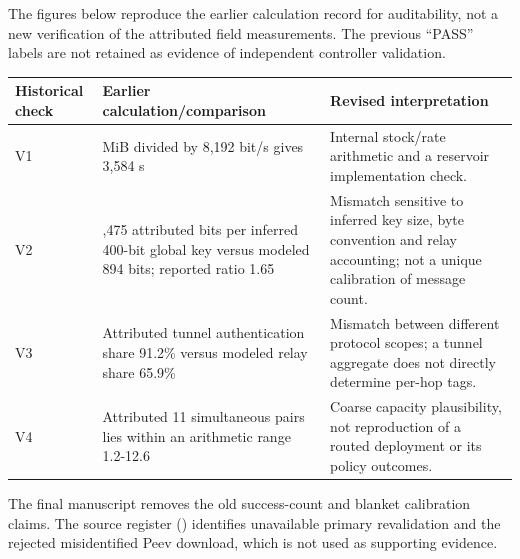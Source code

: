 The figures below reproduce the earlier calculation record for auditability, not a new verification of the attributed field measurements. The previous ``PASS'' labels are not retained as evidence of independent controller validation.

{\def\LTcaptype{none} %
\begin{longtable}[]{@{}
  >{\raggedright\arraybackslash}p{}
  >{\raggedright\arraybackslash}p{}
  >{\raggedright\arraybackslash}p{}@{}}
\toprule\noalign{}
\begin{minipage}[b]{\linewidth}\raggedright
Historical check
\end{minipage} & \begin{minipage}[b]{\linewidth}\raggedright
Earlier calculation/comparison
\end{minipage} & \begin{minipage}[b]{\linewidth}\raggedright
Revised interpretation
\end{minipage} \\
\midrule\noalign{}
\endhead
\bottomrule\noalign{}
\endlastfoot
V1 & 3.5 MiB divided by 8,192 bit/s gives 3,584 s & Internal stock/rate arithmetic and a reservoir implementation check. \\
V2 & 1,475 attributed bits per inferred 400-bit global key versus modeled 894 bits; reported ratio 1.65 & Mismatch sensitive to inferred key size, byte convention and relay accounting; not a unique calibration of message count. \\
V3 & Attributed tunnel authentication share 91.2\% versus modeled relay share 65.9\% & Mismatch between different protocol scopes; a tunnel aggregate does not directly determine per-hop tags. \\
V4 & Attributed 11 simultaneous pairs lies within an arithmetic range 1.2-12.6 & Coarse capacity plausibility, not reproduction of a routed deployment or its policy outcomes. \\
\end{longtable}
}

The final manuscript removes the old success-count and blanket calibration claims. The source register () identifies unavailable primary revalidation and the rejected misidentified Peev download, which is not used as supporting evidence.
